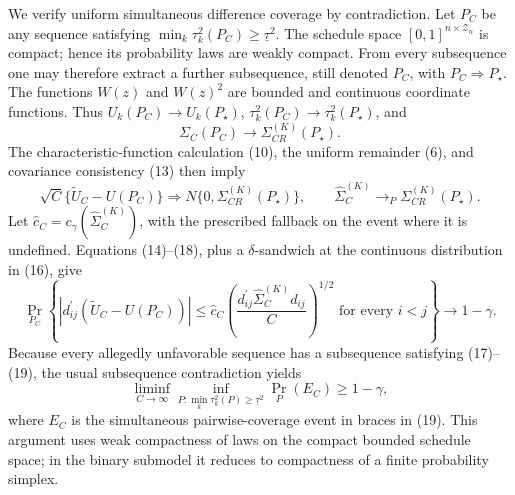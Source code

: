 We verify uniform simultaneous difference coverage by contradiction.  Let \(P_C\) be any sequence satisfying \(\min_k\tau_k^2(P_C)\geq\underline\tau^2\).  The schedule space \([0,1]^{n\times\mathcal Z_n}\) is compact; hence its probability laws are weakly compact.  From every subsequence one may therefore extract a further subsequence, still denoted \(P_C\), with \(P_C\Rightarrow P_\star\).  The functions \(W(z)\) and \(W(z)^2\) are bounded and continuous coordinate functions.  Thus \(U_k(P_C)\to U_k(P_\star)\), \(\tau_k^2(P_C)\to\tau_k^2(P_\star)\), and
\[
 \Sigma_C(P_C)\longrightarrow\Sigma_{CR}^{(K)}(P_\star).                    \tag{17}
\]
The characteristic-function calculation (10), the uniform remainder (6), and covariance consistency (13) then imply
\[
 \sqrt C\{\widetilde U_C-U(P_C)\}\Rightarrow
 N\{0,\Sigma_{CR}^{(K)}(P_\star)\},
 \qquad
 \widehat\Sigma_C^{(K)}\to_P\Sigma_{CR}^{(K)}(P_\star).                    \tag{18}
\]
Let \(\widehat c_C=c_\gamma(\widehat\Sigma_C^{(K)})\), with the prescribed fallback on the event where it is undefined.  Equations (14)--(18), plus a \(\delta\)-sandwich at the continuous distribution in (16), give
\[
 \Pr_{P_C}\!\left\{
  |d_{ij}^{\prime}(\widetilde U_C-U(P_C))|
  \leq \widehat c_C
       \left(\frac{d_{ij}^{\prime}\widehat\Sigma_C^{(K)}d_{ij}}{C}\right)^{1/2}
  \text{ for every }i<j
 \right\}
 \longrightarrow1-\gamma.                                                    \tag{19}
\]
Because every allegedly unfavorable sequence has a subsequence satisfying (17)--(19), the usual subsequence contradiction yields
\[
 \liminf_{C\to\infty}\inf_{P:\min_k\tau_k^2(P)\geq\underline\tau^2}
 \Pr_P(E_C)\geq1-\gamma,                                                      \tag{20}
\]
where \(E_C\) is the simultaneous pairwise-coverage event in braces in (19).  This argument uses weak compactness of laws on the compact bounded schedule space; in the binary submodel it reduces to compactness of a finite probability simplex.

